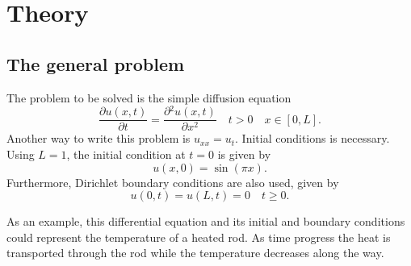 \documentclass[a4paper,11pt,twocolumn]{article}
\begin{document}
\section{Theory}

\subsection{The general problem}

The problem to be solved is the simple diffusion equation
\begin{equation}
\frac{\partial u(x,t)}{\partial t}=\frac{\partial{^2}u(x,t)}{\partial x^2} \quad t>0 \quad x\in [0,L].
	\label{eq:diff}
\end{equation}
Another way to write this problem is $u_{xx} = u_t$. Initial conditions is necessary. Using $L=1$, the initial condition at $t=0$ is given by
\begin{equation}
    u(x,0) = \sin(\pi x)
    \label{eq:incond}.
\end{equation}
Furthermore, Dirichlet boundary conditions are also used, given by
\begin{equation*}
    u(0,t) = u(L,t) = 0 \quad t \geq 0.
\end{equation*}

As an example, this differential equation and its initial and boundary conditions could represent the temperature of a heated rod. As time progress the heat is transported through the rod while the temperature decreases along the way.
\end{document}
